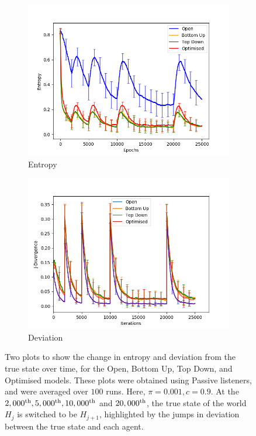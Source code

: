 \begin{figure}[H]
 \centering
  \begin{subfigure}[ht]{0.45\textwidth}
    \includegraphics[width=\textwidth]{Images/Figures/Evidence/EntropyGood.png}
    \caption{Entropy}
 \end{subfigure}
 \hfill
 \begin{subfigure}[ht]{0.45\textwidth}
    \includegraphics[width=\textwidth]{Images/Figures/Evidence/J-DivGood.png}
    \caption{Deviation} \label{fig:evidence_deviation}
 \end{subfigure}
 \caption{Two plots to show the change in entropy and deviation from the true state over time, for the Open, Bottom Up, Top Down, and Optimised models. These plots were obtained using Passive listeners, and were averaged over $100$ runs. Here, $\pi = 0.001, c=0.9$. At the $2,000^{\textnormal{th}},5,000^{\textnormal{th}},10,000^{\textnormal{th}} $ and $ 20,000^{\textnormal{th}} $, the true state of the world $H_j$ is switched to be $H_{j+1}$, highlighted by the jumps in deviation between the true state and each agent.}\label{fig:evidence}
\end{figure}

